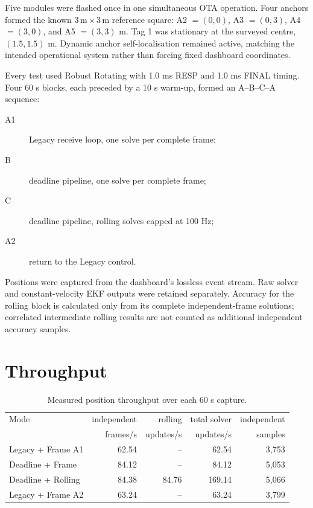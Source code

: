 \documentclass[11pt,a4paper]{article}
\begin{document}
Five modules were flashed once in one simultaneous OTA operation. Four anchors
formed the known \(3\,\mathrm{m}\times3\,\mathrm{m}\) reference square:
A2 \(=(0,0)\), A3 \(=(0,3)\), A4 \(=(3,0)\), and A5 \(=(3,3)\) m. Tag 1
was stationary at the surveyed centre, \((1.5,1.5)\) m. Dynamic anchor
self-localisation remained active, matching the intended operational system
rather than forcing fixed dashboard coordinates.

Every test used Robust Rotating with 1.0 ms RESP and 1.0 ms FINAL timing.
Four 60 s blocks, each preceded by a 10 s warm-up, formed an A--B--C--A
sequence:
\begin{description}
\item[A1] Legacy receive loop, one solve per complete frame;
\item[B] deadline pipeline, one solve per complete frame;
\item[C] deadline pipeline, rolling solves capped at 100 Hz;
\item[A2] return to the Legacy control.
\end{description}

Positions were captured from the dashboard's lossless event stream. Raw solver
and constant-velocity EKF outputs were retained separately. Accuracy for the
rolling block is calculated only from its complete independent-frame
solutions; correlated intermediate rolling results are not counted as
additional independent accuracy samples.

\section{Throughput}

\begin{table}[htbp]
\centering
\small
\begin{tabular}{lrrrr}
\toprule
Mode & independent & rolling & total solver & independent\\
 & frames/s & updates/s & updates/s & samples\\
\midrule
Legacy + Frame A1 & 62.54 & -- & 62.54 & 3,753\\
Deadline + Frame & 84.12 & -- & 84.12 & 5,053\\
Deadline + Rolling & 84.38 & 84.76 & 169.14 & 5,066\\
Legacy + Frame A2 & 63.24 & -- & 63.24 & 3,799\\
\bottomrule
\end{tabular}
\caption{Measured position throughput over each 60 s capture.}
\end{table}
\end{document}
